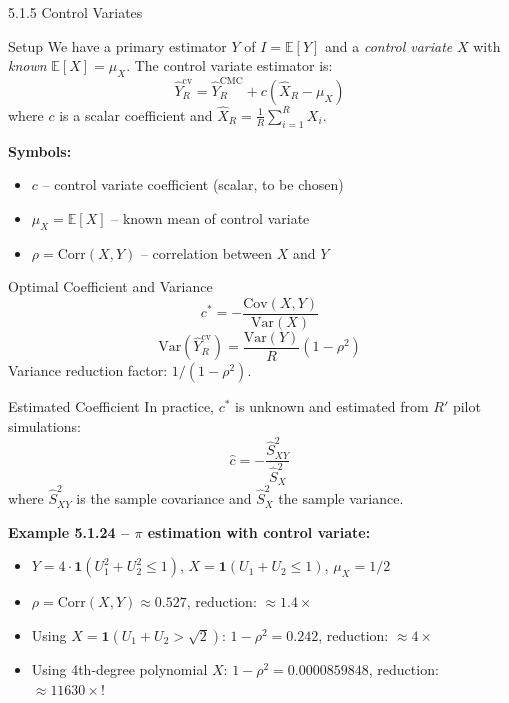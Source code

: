 \documentclass[aspectratio=169,10pt]{beamer}
\begin{document}
\begin{frame}[allowframebreaks]{5.1.5 Control Variates}

  \begin{block}{Setup}
    We have a primary estimator $Y$ of $I = \mathbb{E}[Y]$ and a
    \emph{control variate} $X$ with \emph{known} $\mathbb{E}[X] = \mu_X$.
    The control variate estimator is:
    \[
      \hat{Y}_R^{\mathrm{cv}} = \hat{Y}_R^{\mathrm{CMC}} + c(\hat{X}_R - \mu_X)
    \]
    where $c$ is a scalar coefficient and $\hat{X}_R = \frac{1}{R}\sum_{i=1}^R X_i$.
  \end{block}

  \textbf{Symbols:}
  \begin{itemize}
    \item $c$ -- control variate coefficient (scalar, to be chosen)
    \item $\mu_X = \mathbb{E}[X]$ -- known mean of control variate
    \item $\rho = \mathrm{Corr}(X, Y)$ -- correlation between $X$ and $Y$
  \end{itemize}

  \framebreak

  \begin{block}{Optimal Coefficient and Variance}
    \[
      c^* = -\frac{\mathrm{Cov}(X,Y)}{\mathrm{Var}(X)}
    \]
    \[
      \mathrm{Var}(\hat{Y}_R^{\mathrm{cv}}) = \frac{\mathrm{Var}(Y)}{R}(1 - \rho^2)
    \]
    Variance reduction factor: $1/(1-\rho^2)$.
  \end{block}

  \begin{block}{Estimated Coefficient}
    In practice, $c^*$ is unknown and estimated from $R'$ pilot simulations:
    \[
      \hat{c} = -\frac{\hat{S}_{XY}^2}{\hat{S}_X^2}
    \]
    where $\hat{S}_{XY}^2$ is the sample covariance and $\hat{S}_X^2$ the sample variance.
  \end{block}

  \framebreak

  \textbf{Example 5.1.24 -- $\pi$ estimation with control variate:}
  \begin{itemize}
    \item $Y = 4\cdot\mathbf{1}(U_1^2 + U_2^2 \le 1)$,
          $X = \mathbf{1}(U_1 + U_2 \le 1)$, $\mu_X = 1/2$
    \item $\rho = \mathrm{Corr}(X,Y) \approx 0.527$, reduction: $\approx 1.4\times$
    \item Using $X = \mathbf{1}(U_1+U_2 > \sqrt{2})$: $1-\rho^2 = 0.242$, reduction: $\approx 4\times$
    \item Using 4th-degree polynomial $X$: $1-\rho^2 = 0.0000859848$, reduction: $\approx 11630\times$!
  \end{itemize}

\end{frame}
\end{document}
